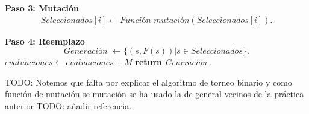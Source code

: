 \begin{algorithm}[H]
\begin{algorithmic}[1]
            \State \textbf{Paso 3:  Mutación}
            \begin{align*}
                Seleccionados[i] \gets \textit{Función-mutación}(Seleccionados[i]).
            \end{align*}
            \EndFor
        
            \State \textbf{Paso 4:  Reemplazo}
            \begin{equation*}
                \textit{Generación } \gets 
                \{
                    (s, F(s)) | s \in  Seleccionados
                \}.
            \end{equation*}
            \State $evaluaciones \gets evaluaciones + M$ 
        \EndWhile
       \State \textbf{return} \textit{Generación }.
    \end{algorithmic}
  \end{algorithm}

TODO: 
  Notemos que falta por explicar el algoritmo de torneo binario 
  y como función de mutación se mutación se ha usado la de general vecinos de la práctica anterior TODO:  añadir referencia. 
